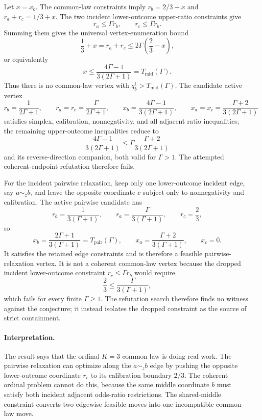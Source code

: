 Let \(x=x_b\).  The common-law constraints imply \(r_b=2/3-x\) and \(r_a+r_c=1/3+x\).  The two incident lower-outcome upper-ratio constraints give
\[
  r_a\le \Gamma r_b,\qquad r_c\le \Gamma r_b.
\]
Summing them gives the universal vertex-enumeration bound
\[
  \frac13+x=r_a+r_c\le 2\Gamma\left(\frac23-x\right),
\]
or equivalently
\[
  x\le \frac{4\Gamma-1}{3(2\Gamma+1)}=T_{\mathrm{mid}}(\Gamma).
\]
Thus there is no common-law vertex with \(q_b^1>T_{\mathrm{mid}}(\Gamma)\).  The candidate active vertex
\[
  r_b=\frac{1}{2\Gamma+1},\qquad
  r_a=r_c=\frac{\Gamma}{2\Gamma+1},\qquad
  x_b=\frac{4\Gamma-1}{3(2\Gamma+1)},\qquad
  x_a=x_c=\frac{\Gamma+2}{3(2\Gamma+1)}
\]
satisfies simplex, calibration, nonnegativity, and all adjacent ratio inequalities; the remaining upper-outcome inequalities reduce to
\[
  \frac{4\Gamma-1}{3(2\Gamma+1)}
  \le
  \Gamma\frac{\Gamma+2}{3(2\Gamma+1)}
\]
and its reverse-direction companion, both valid for \(\Gamma>1\).  The attempted coherent-endpoint refutation therefore fails.

For the incident pairwise relaxation, keep only one lower-outcome incident edge, say \(a\sim_z b\), and leave the opposite coordinate \(c\) subject only to nonnegativity and calibration.  The active pairwise candidate has
\[
  r_b=\frac{1}{3(\Gamma+1)},\qquad
  r_a=\frac{\Gamma}{3(\Gamma+1)},\qquad
  r_c=\frac23,
\]
so
\[
  x_b=\frac{2\Gamma+1}{3(\Gamma+1)}=T_{\mathrm{pair}}(\Gamma),\qquad
  x_a=\frac{\Gamma+2}{3(\Gamma+1)},\qquad
  x_c=0.
\]
It satisfies the retained edge constraints and is therefore a feasible pairwise-relaxation vertex.  It is not a coherent common-law vertex because the dropped incident lower-outcome constraint \(r_c\le \Gamma r_b\) would require
\[
  \frac23\le \frac{\Gamma}{3(\Gamma+1)},
\]
which fails for every finite \(\Gamma\ge 1\).  The refutation search therefore finds no witness against the conjecture; it instead isolates the dropped constraint as the source of strict containment.

\paragraph{Interpretation.}
The result says that the ordinal \(K=3\) common law is doing real work.  The pairwise relaxation can optimize along the \(a\sim_z b\) edge by pushing the opposite lower-outcome coordinate \(r_c\) to its calibration boundary \(2/3\).  The coherent ordinal problem cannot do this, because the same middle coordinate \(b\) must satisfy both incident adjacent odds-ratio restrictions.  The shared-middle constraint converts two edgewise feasible moves into one incompatible common-law move.

